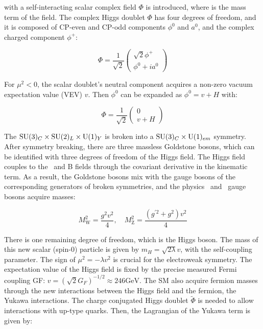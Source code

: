 with a self-interacting \sutwo scalar complex field $\Phi$ is introduced, where \Pgm is the mass term of the field. The complex Higgs doublet $\Phi$ has four degrees of freedom, and it is composed of CP-even and CP-odd components $\phi^{0}$ and $a^{0}$, and the complex charged component $\phi^{+}$:

\begin{equation}
  \Phi=\frac{1}{\sqrt{2}}\left(
  \begin{array}{c}
    \sqrt{2} \phi^{+} \\
    \phi^{0}+i a^{0}
  \end{array}\right)
\end{equation}

For $\mu^2<0$, the scalar doublet's neutral component acquires a non-zero vacuum expectation value (VEV) $v$. Then $\phi^{0}$ can be expanded as $\phi^{0}=v+H$ with:

\begin{equation}
  \Phi=\frac{1}{\sqrt{2}}\left(
  \begin{array}{c}
    0 \\
    v + H
  \end{array}\right)
\end{equation}

The $\text{SU}(3)_{C} \times \text{SU}(2)_{L} \times \text{U}(1)_{Y}$ is broken into a $\text{SU}(3)_{C} \times \text{U}(1)_{em}$ symmetry. After symmetry breaking, there are three massless Goldstone bosons, which can be identified with three degrees of freedom of the Higgs field. The Higgs field couples to the \PW\, and B fields through the covariant derivative in the kinematic term. As a result, the Goldstone bosons mix with the gauge bosons of the corresponding generators of broken symmetries, and the physics \PW\, and \PZ\, gauge bosons acquire masses:

\begin{equation}
  M_{\mathrm{W}}^2=\frac{g^2 v^2}{4}, \quad M_{\mathrm{Z}}^2=\frac{(g^{\prime 2}+g^2) v^2}{4}
\end{equation}

There is one remaining degree of freedom, which is the Higgs boson. The mass of this new scalar (spin-0) particle is given by $m_{H}=\sqrt{2 \lambda} v$, with the self-coupling parameter. The sign of $\mu^2=-\lambda v^2$ is crucial for the electroweak symmetry. The expectation value of the Higgs field is fixed by the precise measured Fermi coupling GF: $v=(\sqrt{2} G_{F})^{-1 / 2} \approx 246 \mathrm{GeV}$. The SM also acquire fermion masses through the new interactions between the Higgs field and the fermion, the Yukawa interactions. The charge conjugated Higgs doublet $\tilde{\Phi}$ is needed to allow interactions with up-type quarks. Then, the Lagrangian of the Yukawa term is given by:

